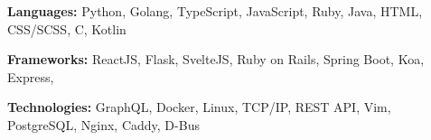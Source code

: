 \textbf{Languages:} Python,  Golang, TypeScript, JavaScript, Ruby, Java, HTML, CSS\slash SCSS, C, Kotlin

\vspace{0.2cm}

\textbf{Frameworks:} ReactJS, Flask, SvelteJS, Ruby on Rails, Spring Boot, Koa, Express,

\vspace{0.2cm}

\textbf{Technologies:} GraphQL, Docker, Linux, TCP/IP, REST API, Vim, PostgreSQL, Nginx, Caddy, D-Bus
